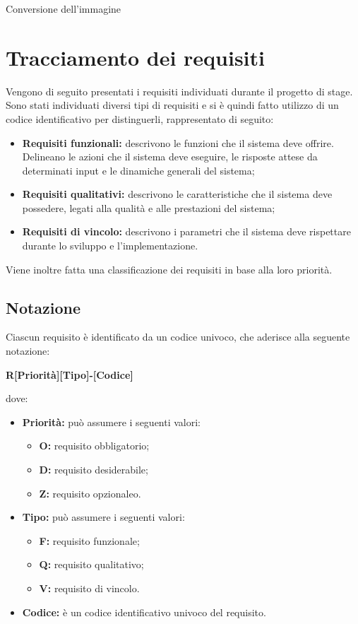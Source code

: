 \begin{usecase}{2}{Conversione dell'immagine}

\end{usecase}

\section{Tracciamento dei requisiti}

Vengono di seguito presentati i requisiti individuati durante il progetto di
stage.\\
Sono stati individuati diversi tipi di requisiti e si è quindi fatto utilizzo di
un codice identificativo per distinguerli, rappresentato di seguito:
\begin{itemize}
    \item \textbf{Requisiti funzionali:} descrivono le funzioni che il sistema
          deve offrire. Delineano le azioni che il sistema deve eseguire, le
          risposte attese da determinati input e le dinamiche generali del sistema;
    \item \textbf{Requisiti qualitativi:} descrivono le caratteristiche che il
          sistema deve possedere, legati alla qualità e alle prestazioni del sistema;
    \item \textbf{Requisiti di vincolo:} descrivono i parametri che il sistema
          deve rispettare durante lo sviluppo e l'implementazione.
\end{itemize}
Viene inoltre fatta una classificazione dei requisiti in base alla loro
priorità.

\subsection{Notazione}
Ciascun requisito è identificato da un codice univoco, che aderisce alla
seguente notazione:
\begin{center}
    \textbf{R[Priorità][Tipo]-[Codice]}
\end{center}
dove:
\begin{itemize}
    \item \textbf{Priorità:} può assumere i seguenti valori:
          \begin{itemize}
              \item \textbf{O:} requisito obbligatorio;
              \item \textbf{D:} requisito desiderabile;
              \item \textbf{Z:} requisito opzionaleo.
          \end{itemize}
    \item \textbf{Tipo:} può assumere i seguenti valori:
          \begin{itemize}
              \item \textbf{F:} requisito funzionale;
              \item \textbf{Q:} requisito qualitativo;
              \item \textbf{V:} requisito di vincolo.
          \end{itemize}
    \item \textbf{Codice:} è un codice identificativo univoco del requisito.
\end{itemize}

